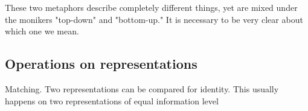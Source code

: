 These two metaphors describe completely different things, yet are mixed under the monikers "top-down" and "bottom-up." It is necessary to be very clear about which one we mean.

\subsection{Operations on representations}

Matching. Two representations can be compared for identity. This usually happens on two representations of equal information level

